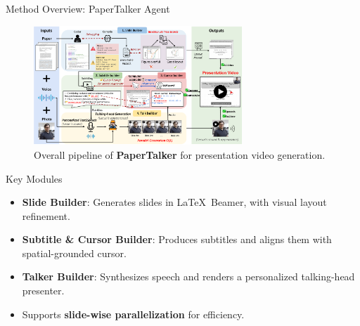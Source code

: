 \documentclass{beamer}
\newcommand{\alertterm}[1]{\alert{\textbf{#1}}}
\begin{document}
\begin{frame}{Method Overview: PaperTalker Agent}
  \begin{figure}
    \centering
    \includegraphics[width=0.7\textwidth]{figure/method.pdf}
    \caption{Overall pipeline of \alertterm{PaperTalker} for presentation video generation.}
    \label{fig:method}
  \end{figure}
  \vspace{-1 \baselineskip}
  \begin{block}{Key Modules}
    \scriptsize
    \begin{itemize}
      \item \alertterm{Slide Builder}: Generates slides in \LaTeX~Beamer, with visual layout refinement.
      \item \alertterm{Subtitle \& Cursor Builder}: Produces subtitles and aligns them with spatial-grounded cursor.
      \item \alertterm{Talker Builder}: Synthesizes speech and renders a personalized talking-head presenter.
      \item Supports \alertterm{slide-wise parallelization} for efficiency.
    \end{itemize}
  \end{block}
\end{frame}
\end{document}
